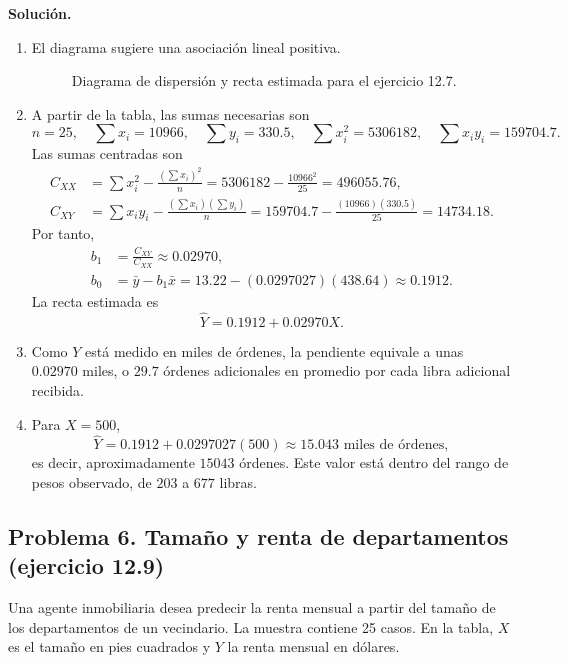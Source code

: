 \textbf{Solución.}
\begin{enumerate}
    \item[\textbf{a)}] El diagrama sugiere una asociación lineal positiva.
    \begin{figure}[H]
    \centering
    
    \caption{Diagrama de dispersión y recta estimada para el ejercicio 12.7.}
    \label{fig:clase4-mail}
    \end{figure}
    \item[\textbf{b)}] A partir de la tabla, las sumas necesarias son
    \[
    n=25,\quad \sum x_i=10966,\quad \sum y_i=330.5,\quad
    \sum x_i^2=5306182,\quad \sum x_iy_i=159704.7.
    \]
    Las sumas centradas son
    \begin{align*}
    C_{XX}&=\sum x_i^2-\frac{(\sum x_i)^2}{n}
    =5306182-\frac{10966^2}{25}=496055.76,\\
    C_{XY}&=\sum x_iy_i-\frac{(\sum x_i)(\sum y_i)}{n}
    =159704.7-\frac{(10966)(330.5)}{25}=14734.18.
    \end{align*}
    Por tanto,
    \begin{align*}
    b_1&=\frac{C_{XY}}{C_{XX}}\approx0.02970,\\
    b_0&=\bar y-b_1\bar x
    =13.22-(0.0297027)(438.64)\approx0.1912.
    \end{align*}
    La recta estimada es
    \[
    \widehat Y=0.1912+0.02970X.
    \]
    \item[\textbf{c)}] Como $Y$ está medido en miles de órdenes, la pendiente equivale a unas $0.02970$ miles, o $29.7$ órdenes adicionales en promedio por cada libra adicional recibida.
    \item[\textbf{d)}] Para $X=500$,
    \[
    \widehat Y=0.1912+0.0297027(500)\approx15.043\text{ miles de órdenes},
    \]
    es decir, aproximadamente $15043$ órdenes. Este valor está dentro del rango de pesos observado, de $203$ a $677$ libras.
\end{enumerate}

\subsection{Problema 6. Tamaño y renta de departamentos (ejercicio 12.9)}

Una agente inmobiliaria desea predecir la renta mensual a partir del tamaño de los departamentos de un vecindario. La muestra contiene 25 casos. En la tabla, $X$ es el tamaño en pies cuadrados y $Y$ la renta mensual en dólares.

